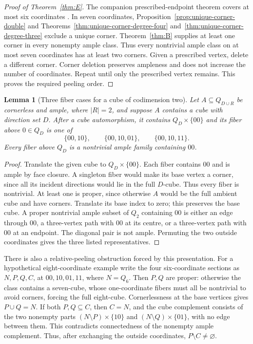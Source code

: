 \documentclass[11pt]{article}
\numberwithin{equation}{section}
\newtheorem{lemma}[theorem]{Lemma}
\theoremstyle{definition}
\theoremstyle{remark}
\begin{document}
\begin{proof}[Proof of Theorem~\ref{thm:E}]
The companion prescribed-endpoint theorem covers at most six coordinates
\cite{BousquetDampReader}. In seven coordinates,
Proposition~\ref{prop:unique-corner-double} and
Theorems~\ref{thm:unique-corner-degree-four}
and~\ref{thm:unique-corner-degree-three} exclude a unique corner.
Theorem~\ref{thm:B} supplies at least one corner in every nonempty
ample class. Thus every nontrivial ample class on at most seven
coordinates has at least two corners. Given a prescribed vertex,
delete a different corner. Corner deletion preserves ampleness and
does not increase the number of coordinates. Repeat until only the
prescribed vertex remains. This proves the required peeling order.
\end{proof}

\begin{lemma}[Three fiber cases for a cube of codimension two]
\label{lem:cornerless-codimension-two-fibers}
Let $A\subseteq Q_{D\cup R}$ be cornerless and ample, where $|R|=2$,
and suppose $A$ contains a cube with direction set $D$. After a cube
automorphism, it contains $Q_D\times\{00\}$ and its fiber above
$0\in Q_D$ is one of
\[
 \{00,10\},\qquad \{00,10,01\},\qquad \{00,10,11\}.
\]
Every fiber above $Q_D$ is a nontrivial ample family containing $00$.
\end{lemma}
\begin{proof}
Translate the given cube to $Q_D\times\{00\}$. Each fiber contains
$00$ and is ample by face closure. A singleton fiber would make its
base vertex a corner, since all its incident directions would lie in
the full $D$-cube. Thus every fiber is nontrivial. At least one is
proper, since otherwise $A$ would be the full ambient cube and have
corners. Translate its base index to zero; this preserves the base cube.
A proper nontrivial ample subset of $Q_2$ containing $00$ is either
an edge through $00$, a three-vertex path with $00$ at its centre,
or a three-vertex path with $00$ at an endpoint. The diagonal pair
is not ample. Permuting the two outside coordinates gives the three
listed representatives.
\end{proof}

There is also a relative-peeling obstruction forced by this presentation.
For a hypothetical eight-coordinate example write the four six-coordinate
sections as $N,P,Q,C$, at $00,10,01,11$, where $N=Q_6$. Then
$P,Q$ are proper: otherwise the class contains a seven-cube, whose
one-coordinate fibers must all be nontrivial to avoid corners, forcing
the full eight-cube. Cornerlessness at the base vertices gives $P\cup Q=N$.
If both $P,Q\subseteq C$, then $C=N$, and the cube complement consists
of the two nonempty parts $(N\setminus P)\times\{10\}$ and
$(N\setminus Q)\times\{01\}$, with no edge between them. This contradicts
connectedness of the nonempty ample complement. Thus, after exchanging
the outside coordinates, $P\setminus C\ne\varnothing$.
\end{document}
